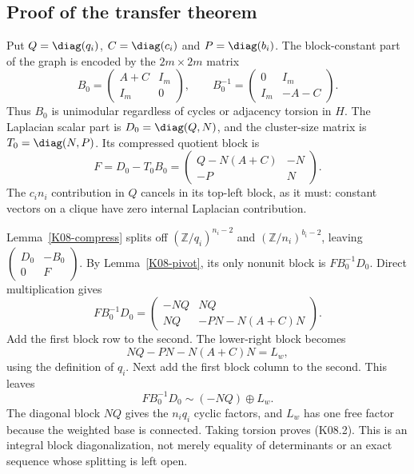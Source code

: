 \documentclass[11pt,a4paper]{article}
\theoremstyle{definition}\newtheorem{definition}[theorem]{Definition}
\theoremstyle{remark}\newtheorem{remark}[theorem]{Remark}
\newcommand{\Z}{\mathbb Z}\newcommand{\Q}{\mathbb Q}\newcommand{\F}{\mathbb F}
\numberwithin{equation}{section}
\begin{document}
\subsection{Proof of the transfer theorem}\label{K08-sec-3}
Put $Q=\diag(q_i)$, $C=\diag(c_i)$ and $P=\diag(b_i)$. The block-constant part of the graph is encoded by the $2m\times2m$ matrix
\[
 B_0=\begin{pmatrix}A+C&I_m\\I_m&0\end{pmatrix},\qquad
 B_0^{-1}=\begin{pmatrix}0&I_m\\I_m&-A-C\end{pmatrix}.        \tag{K08.5}
\]
Thus $B_0$ is unimodular regardless of cycles or adjacency torsion in $H$. The Laplacian scalar part is $D_0=\diag(Q,N)$, and the cluster-size matrix is $T_0=\diag(N,P)$. Its compressed quotient block is
\[
 F=D_0-T_0B_0
 =\begin{pmatrix}Q-N(A+C)&-N\\-P&N\end{pmatrix}.            \tag{K08.6}
\]
The $c_i n_i$ contribution in $Q$ cancels in its top-left block, as it must: constant vectors on a clique have zero internal Laplacian contribution.

Lemma~\ref{K08-compress} splits off $(\Z/q_i)^{n_i-2}$ and $(\Z/n_i)^{b_i-2}$, leaving
$\left(\begin{smallmatrix}D_0&-B_0\\0&F\end{smallmatrix}\right)$.
By Lemma~\ref{K08-pivot}, its only nonunit block is $FB_0^{-1}D_0$. Direct multiplication gives
\[
 FB_0^{-1}D_0
 =\begin{pmatrix}
 -NQ&NQ\\
 NQ&-PN-N(A+C)N
 \end{pmatrix}.                                             \tag{K08.7}
\]
Add the first block row to the second. The lower-right block becomes
\[
 NQ-PN-N(A+C)N=L_w,                                         \tag{K08.8}
\]
using the definition of $q_i$. Next add the first block column to the second. This leaves
\[
 FB_0^{-1}D_0\sim (-NQ)\oplus L_w.                          \tag{K08.9}
\]
The diagonal block $NQ$ gives the $n_iq_i$ cyclic factors, and $L_w$ has one free factor because the weighted base is connected. Taking torsion proves (K08.2). This is an integral block diagonalization, not merely equality of determinants or an exact sequence whose splitting is left open.
\end{document}
